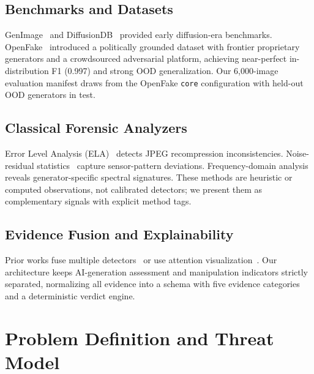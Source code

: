 \documentclass[10pt,conference,compsoc]{IEEEtran}
\begin{document}
\subsection{Benchmarks and Datasets}
GenImage~\cite{zhu2023genimage} and DiffusionDB~\cite{wang2022diffusiondb} provided early diffusion-era benchmarks.
OpenFake~\cite{livernoche2025openfake} introduced a politically grounded dataset with frontier proprietary generators and a crowdsourced adversarial platform, achieving near-perfect in-distribution F1 (0.997) and strong OOD generalization.
Our 6,000-image evaluation manifest draws from the OpenFake \texttt{core} configuration with held-out OOD generators in test.

\subsection{Classical Forensic Analyzers}
Error Level Analysis (ELA)~\cite{krawetz2007ela} detects JPEG recompression inconsistencies.
Noise-residual statistics~\cite{li2013identification} capture sensor-pattern deviations.
Frequency-domain analysis~\cite{qian2020thinking} reveals generator-specific spectral signatures.
These methods are heuristic or computed observations, not calibrated detectors; we present them as complementary signals with explicit method tags.

\subsection{Evidence Fusion and Explainability}
Prior works fuse multiple detectors~\cite{cozzolino2018noiseprint, guillaro2023explaining} or use attention visualization~\cite{chefer2021transformer-interpretability}.
Our architecture keeps AI-generation assessment and manipulation indicators strictly separated, normalizing all evidence into a schema with five evidence categories and a deterministic verdict engine.

\section{Problem Definition and Threat Model}
\label{sec:scope}
\end{document}

